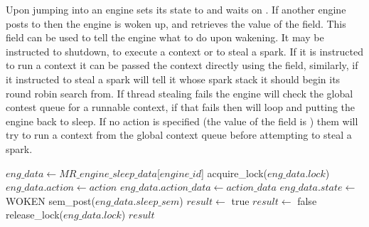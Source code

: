 Upon jumping into \idle an engine sets its state to  and
waits on .
If another engine posts to  then the engine is woken up,
and retrieves the value of the  field.
This field can be used to tell the engine what to do upon wakening.
It may be instructed to shutdown, to execute a context or to steal a spark.
If it is instructed to run a context it can be passed the context directly
using the  field,
similarly, if it instructed to steal a spark  will tell
it whose spark stack it should begin its round robin search from.
If thread stealing fails the engine will check the global contest queue for
a runnable context,
if that fails then \idle will loop and putting the engine back to sleep.
If no action is specified
(the value of the  field is )
them \sleep will try to run a context from the global context queue before
attempting to steal a spark.

\begin{algorithm}[tbp]
\begin{algorithmic}
    \State $eng\_data \gets MR\_engine\_sleep\_data$[$engine\_id$]
    \State acquire\_lock($eng\_data.lock$)
        \State $eng\_data.action \gets action$
        \State $eng\_data.action\_data \gets action\_data$
        \State $eng\_data.state \gets$ WOKEN
        \State sem\_post($eng\_data.sleep\_sem$)
        \State $result \gets$ true
    \Else
        \State $result \gets$ false
    \EndIf
    \State release\_lock($eng\_data.lock$)
    \Return $result$
\EndProcedure
\end{algorithmic}
\caption{\wakeengine}
\label{alg:wake_engine}
\end{algorithm}


